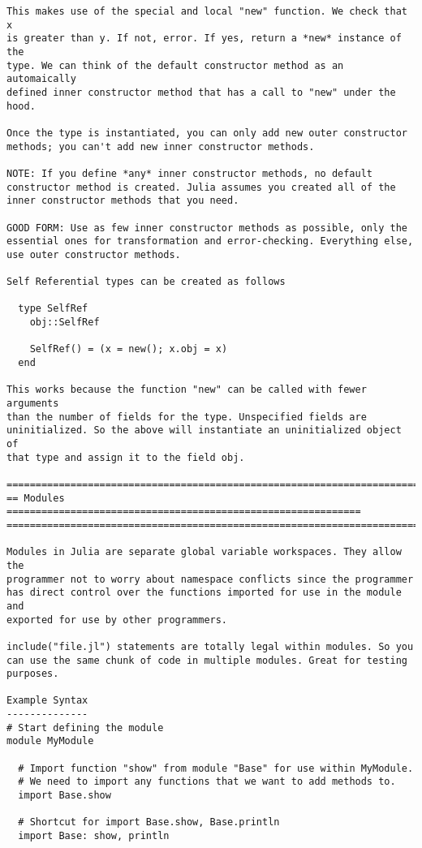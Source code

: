 \documentclass[12pt]{article}
\theoremstyle{plain}
\theoremstyle{definition}
\theoremstyle{remark}
\begin{document}
\begin{lstlisting}
This makes use of the special and local "new" function. We check that x
is greater than y. If not, error. If yes, return a *new* instance of the
type. We can think of the default constructor method as an automaically
defined inner constructor method that has a call to "new" under the
hood.

Once the type is instantiated, you can only add new outer constructor
methods; you can't add new inner constructor methods.

NOTE: If you define *any* inner constructor methods, no default
constructor method is created. Julia assumes you created all of the
inner constructor methods that you need.

GOOD FORM: Use as few inner constructor methods as possible, only the
essential ones for transformation and error-checking. Everything else,
use outer constructor methods.

Self Referential types can be created as follows

  type SelfRef
    obj::SelfRef

    SelfRef() = (x = new(); x.obj = x)
  end

This works because the function "new" can be called with fewer arguments
than the number of fields for the type. Unspecified fields are
uninitialized. So the above will instantiate an uninitialized object of
that type and assign it to the field obj.

========================================================================
== Modules =============================================================
========================================================================

Modules in Julia are separate global variable workspaces. They allow the
programmer not to worry about namespace conflicts since the programmer
has direct control over the functions imported for use in the module and
exported for use by other programmers.

include("file.jl") statements are totally legal within modules. So you
can use the same chunk of code in multiple modules. Great for testing
purposes.

Example Syntax
--------------
# Start defining the module
module MyModule

  # Import function "show" from module "Base" for use within MyModule.
  # We need to import any functions that we want to add methods to.
  import Base.show

  # Shortcut for import Base.show, Base.println
  import Base: show, println


\end{lstlisting}
\end{document}
